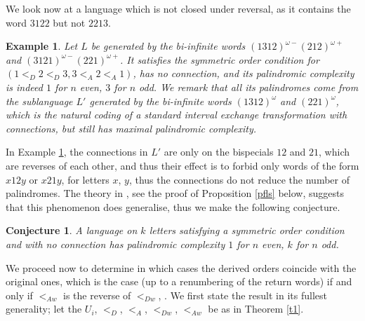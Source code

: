 \documentclass[12pt,a4paper]{amsart}
\newtheorem{example}{Example}
\newtheorem{conj}{Conjecture}
\begin{document}
 We look now at a language which is not closed under reversal, as it contains the word $3122$ but not $2213$.
 
\begin{example}\label{e2} Let $L$ be generated by the bi-infinite words  $(1312)^{\omega-}(212)^{\omega+}$ and $(3121)^{\omega-}(221)^{\omega+}$. It  satisfies the symmetric order condition for  $(1<_D 2<_D 3, 3<_A 2<_A 1)$, has no connection, and  its palindromic complexity is indeed $1$ for 
  $n$ even, $3$ for $n$ odd. We remark that all its palindromes come from the sublanguage $L'$ 
 generated by the bi-infinite words  $(1312)^{\omega}$ and $(221)^{\omega}$, which is  the natural coding of a standard  interval exchange transformation with connections, but still has maximal palindromic complexity.
  \end{example}
 
In Example \ref{e2}, the connections in $L'$ are only on the bispecials $12$ and $21$, which are reverses of each other, and thus their effect is to forbid only words of the form $x12y$ or $x21y$, for letters $x$, $y$, thus the connections do not reduce the number of palindromes. The theory in  \cite{fz1}, see
the proof of Proposition \ref{pfls} below, suggests that this phenomenon does generalise, thus we make the following conjecture.

\begin{conj}  A language on $k$ letters satisfying a symmetric order condition and with no connection has palindromic complexity $1$ for $n$ even, $k$ for $n$ odd.
\end{conj}




 



We proceed now to determine in which cases the derived orders coincide with the original ones, which is the case (up to a renumbering of the return words) if and only if   $<_{Aw}$ is the reverse of $<_{Dw}$,
. We first state the result in its fullest generality; let the $U_i$, $<_D$, $<_A$, $<_{Dw}$, $<_{Aw}$ be as in Theorem \ref{t1}.
\end{document}
